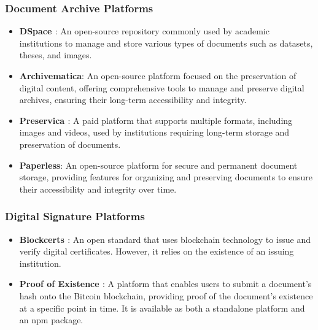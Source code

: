 \documentclass[a4paper,11pt]{article}
\begin{document}
            \subsubsection{Document Archive Platforms}
            \begin{itemize}
                \item \textbf{DSpace \cite{DSpace}}: An open-source repository commonly used by academic institutions to manage and store various types of documents such as datasets, theses, and images.
                
                \item \textbf{Archivematica}: An open-source platform focused on the preservation of digital content, offering comprehensive tools to manage and preserve digital archives, ensuring their long-term accessibility and integrity.
                
                \item \textbf{Preservica \cite{Preservica}}: A paid platform that supports multiple formats, including images and videos, used by institutions requiring long-term storage and preservation of documents.
                
                \item \textbf{Paperless}: An open-source platform for secure and permanent document storage, providing features for organizing and preserving documents to ensure their accessibility and integrity over time.
            \end{itemize}
    
        \subsubsection{Digital Signature Platforms}
        \begin{itemize}
            \item \textbf{Blockcerts \cite{Blockcerts}}: An open standard that uses blockchain technology to issue and verify digital certificates. However, it relies on the existence of an issuing institution.
            
            \item \textbf{Proof of Existence \cite{ProofOfExistence}}: A platform that enables users to submit a document's hash onto the Bitcoin blockchain, providing proof of the document's existence at a specific point in time. It is available as both a standalone platform and an npm package.
        \end{itemize}
        
\end{document}
